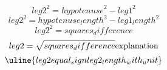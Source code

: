 \[ {leg2}^{2}={hypotenuse}^{2}-{leg1}^{2} \]
\[ {leg2}^{2}={hypotenuse_length}^{2}-{leg1_length}^{2} \]
\[ {leg2}^{2}={squares_difference} \]
\[ {leg2}=\sqrt{\mathstrut {squares_difference}}\text{{explanation}}\]
\[ \uline{{leg2}{equal_sign}{leg2_length_with_unit}}\]